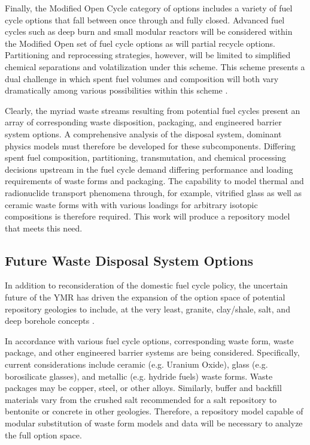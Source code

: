 
Finally, the Modified Open Cycle category of options includes a variety of fuel 
cycle options that fall between once through and fully closed. Advanced fuel 
cycles such as deep burn and small modular reactors will be considered within 
the Modified Open set of fuel cycle options as will partial recycle options.  
Partitioning and reprocessing strategies, however, will be limited to simplified 
chemical separations and volatilization under this scheme. This scheme presents
a dual challenge in which spent fuel volumes and composition will both vary 
dramatically among various possibilities within this scheme 
\cite{doe_nuclear_2010} .


Clearly, the myriad waste streams resulting from potential fuel cycles present 
an array of corresponding waste disposition, packaging, and engineered barrier 
system options. A comprehensive analysis of the disposal system, dominant 
physics models must therefore be developed for these subcomponents.  Differing 
spent fuel composition, partitioning, transmutation, and chemical processing 
decisions upstream in the fuel cycle demand differing performance and loading 
requirements of waste forms and packaging. The capability to model thermal and 
radionuclide transport phenomena through, for example, vitrified glass as well 
as ceramic waste forms with with various loadings for arbitrary isotopic 
compositions is therefore required. This work will produce a repository model 
that meets this need. 

\subsection{Future Waste Disposal System Options}


In addition to reconsideration of the domestic fuel cycle policy, the uncertain 
future of the \gls{YMR} has driven the expansion of the option space of 
potential repository geologies to include, at the very least, granite, 
clay/shale, salt, and deep borehole concepts \cite{nutt_used_2010}. 


In accordance with various fuel cycle options, corresponding waste form, waste 
package, and other engineered barrier systems are being considered.  
Specifically, current considerations include ceramic (e.g.  Uranium Oxide), 
glass (e.g.  borosilicate glasses), and metallic (e.g.  hydride fuels) waste 
forms. Waste packages may be copper, steel, or other alloys. Similarly, buffer 
and backfill materials vary from the crushed salt recommended for a salt 
repository to bentonite or concrete in other geologies. Therefore, a repository  
model capable of modular substitution of waste form models and data will be 
necessary to analyze the full option space.

